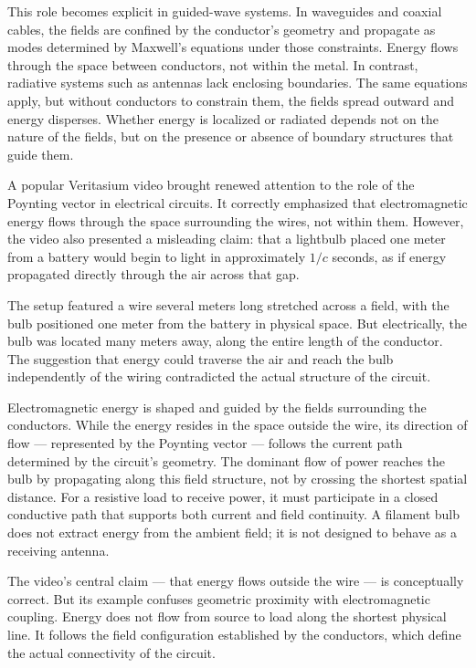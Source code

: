 This role becomes explicit in guided-wave systems. In waveguides and coaxial cables, the fields are confined by the conductor's geometry and propagate as modes determined by Maxwell's equations under those constraints. Energy flows through the space between conductors, not within the metal. In contrast, radiative systems such as antennas lack enclosing boundaries. The same equations apply, but without conductors to constrain them, the fields spread outward and energy disperses. Whether energy is localized or radiated depends not on the nature of the fields, but on the presence or absence of boundary structures that guide them.



\begin{commentary}
A popular Veritasium video brought renewed attention to the role of the Poynting vector in electrical circuits. It correctly emphasized that electromagnetic energy flows through the space surrounding the wires, not within them. However, the video also presented a misleading claim: that a lightbulb placed one meter from a battery would begin to light in approximately $1/c$ seconds, as if energy propagated directly through the air across that gap.

The setup featured a wire several meters long stretched across a field, with the bulb positioned one meter from the battery in physical space. But electrically, the bulb was located many meters away, along the entire length of the conductor. The suggestion that energy could traverse the air and reach the bulb independently of the wiring contradicted the actual structure of the circuit.

Electromagnetic energy is shaped and guided by the fields surrounding the conductors. While the energy resides in the space outside the wire, its direction of flow — represented by the Poynting vector — follows the current path determined by the circuit's geometry. The dominant flow of power reaches the bulb by propagating along this field structure, not by crossing the shortest spatial distance. For a resistive load to receive power, it must participate in a closed conductive path that supports both current and field continuity. A filament bulb does not extract energy from the ambient field; it is not designed to behave as a receiving antenna.

The video's central claim — that energy flows outside the wire — is conceptually correct. But its example confuses geometric proximity with electromagnetic coupling. Energy does not flow from source to load along the shortest physical line. It follows the field configuration established by the conductors, which define the actual connectivity of the circuit.
\end{commentary}



